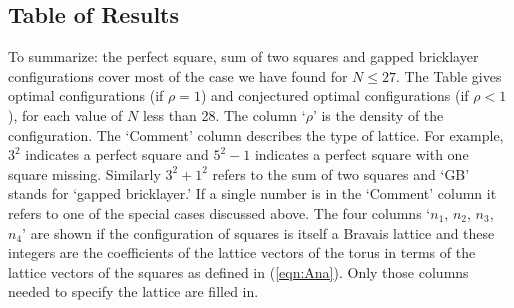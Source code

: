 \subsection{Table of Results}

To summarize: the perfect square, sum of two squares and gapped bricklayer configurations cover most of the case we have found for $N \leq 27$.  The Table gives optimal configurations (if $\rho=1$) and conjectured optimal configurations (if $\rho<1$), for each value of  $N$ less than 28.  The column `$\rho$' is the density of the configuration. The `Comment' column describes the type of lattice.   For example, $3^2$ indicates a perfect square and $5^2-1$ indicates a perfect square with one square missing.  Similarly $3^2+1^2$ refers to the sum of two squares and `GB' stands for `gapped bricklayer.'  If a single number is in the `Comment' column it refers to one of the special cases discussed above.  The four columns `$n_1$, $n_2$, $n_3$, $n_4$' are shown if the configuration of squares is itself a Bravais lattice and these integers are the coefficients of the lattice vectors of the torus in terms of the lattice vectors of the squares as defined in (\ref{eqn:Ana}).  Only those columns needed to specify the lattice are filled in.

